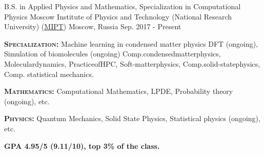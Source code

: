 

\begin{cventries}

  \cventry
    {B.S. in Applied Physics and Mathematics, Specialization in Computational Physics} %
    {Moscow Institute of Physics and Technology (National Research University) (\href{https://mipt.ru/english/}{MIPT})} %
    {Moscow, Russia} %
    {Sep. 2017 - Present} %
    {
      \begin{cvitems} %
        \item {\textsc{\textbf{Specialization:}} \hspace{5pt} \textsf{Machine learning in condensed matter physics} \hspace{10pt} \textsf{DFT (ongoing)}, \hspace{10pt} \textsf{Simulation of biomolecules (ongoing)} \newline Comp.\hspace{2pt}condensed\hspace{2pt}matter\hspace{2pt}physics, \hspace{4pt} Molecular\hspace{2pt}dynamics, \hspace{4pt} Practice\hspace{2pt}of\hspace{2pt}HPC, \hspace{4pt} Soft-matter\hspace{2pt}physics, \hspace{4pt} Comp.\hspace{2pt}solid-state\hspace{2pt}physics, \hspace{4pt} Comp. statistical mechanics.}
        \item {\textsc{\textbf{Mathematics:}} \hspace{5pt} Computational Mathematics, \hspace{10pt} LPDE, \hspace{10pt} Probability theory (ongoing), \hspace{10pt} etc.}
        \item {\textsc{\textbf{Physics:}} \hspace{5pt} Quantum Mechanics, \hspace{10pt} Solid State Physics, \hspace{10pt} Statistical physics (ongoing), \hspace{10pt} etc.}
		\item {\textbf{GPA 4.95/5 (9.11/10), top 3\% of the class.}}        
      \end{cvitems}
    }

\end{cventries}
